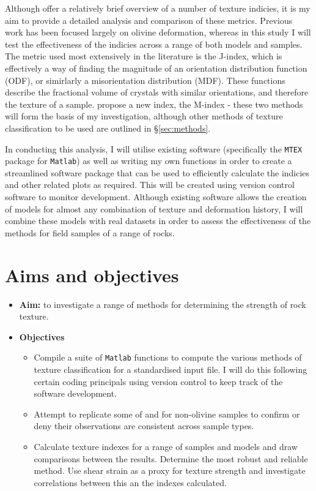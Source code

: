 \documentclass[a4paper,11pt]{article}
\numberwithin{equation}{section}
\begin{document}
Although \cite{Mainprice} offer a relatively brief overview of a number of texture indicies, it is my aim to provide a detailed analysis and comparison of these metrics. Previous work has been focused largely on olivine deformation, whereas in this study I will test the effectiveness of the indicies across a range of both models and samples. The metric used most extensively in the literature is the J-index, which is effectively a way of finding the magnitude of an orientation distribution function (ODF), or simirlarly a misorientation distribution (MDF). These functions describe the fractional volume of crystals with similar orientations, and therefore the texture of a sample. \cite{Skemer} propose a new index, the M-index - these two methods will form the basis of my investigation, although other methods of texture classification to be used are outlined in \S\ref{sec:methods}.

In conducting this analysis, I will utilise existing software (specifically the \texttt{MTEX} package for \texttt{Matlab}) as well as writing my own functions in order to create a streamlined software package that can be used to efficiently calculate the indicies and other related plots as required. This will be created using version control software to monitor development. Although existing software allows the creation of models for almost any combination of texture and deformation history, I will combine these models with real datasets in order to assess the effectiveness of the methods for field samples of a range of rocks.

\section{Aims and objectives}

\begin{itemize}
	\item \textbf{Aim:} to investigate a range of methods for determining the strength of rock texture.
	 
	\item \textbf{Objectives}
	\begin{itemize}
		\item Compile a suite of \texttt{Matlab} functions to compute the various methods of texture classification for a standardised input file. I will do this following certain coding principals \citep{Computing} using version control to keep track of the software development.
		\item Attempt to replicate some of \cite{Skemer} and \cite{Mainprice} for non-olivine samples to confirm or deny their observations are consistent across sample types.
		\item Calculate texture indexes for a range of samples and models and draw comparisons between the results. Determine the most robust and reliable method. Use shear strain as a proxy for texture strength and investigate correlations between this an the indexes calculated.
	\end{itemize}
\end{itemize}
\end{document}
